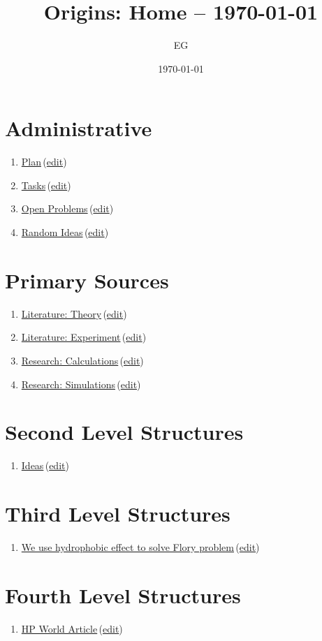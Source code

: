 \documentclass[12pt]{paper}
\title{Origins: Home -- \today}
\author{EG}
\date{\today}
\newcommand{\wikilink}[2] { \href{#1.pdf}{#2}\,(\href{#1.tex}{edit})}
\begin{document}
 \maketitle
 \tableofcontents
 
\section{Administrative}


\begin{enumerate}
 \item \wikilink{plan}{Plan}
 \item \wikilink{tasks}{Tasks}
 \item \wikilink{open\_problems}{Open Problems}
 \item \wikilink{random\_ideas}{Random Ideas}
 
\end{enumerate}

\section{Primary Sources}
\begin{enumerate}
 \item \wikilink{literature\_theory}{Literature: Theory}
 \item \wikilink{literature\_experiment}{Literature: Experiment}
 \item \wikilink{research\_calculations}{Research: Calculations}
 \item \wikilink{research\_simulations}{Research: Simulations}
\end{enumerate}

\section{Second Level Structures}
\begin{enumerate}
 \item \wikilink{ideas}{Ideas}
\end{enumerate}

\section{Third Level Structures}
\begin{enumerate}
 \item \wikilink{we\_use\_hydrophobic\_effect\_to\_solve\_flory\_problem}{We use hydrophobic 
effect to solve Flory problem}
\end{enumerate}
\section{Fourth Level Structures}
\begin{enumerate}
 \item \wikilink{hp\_world}{HP World Article}
\end{enumerate}




% 
% 

 
\end{document}
